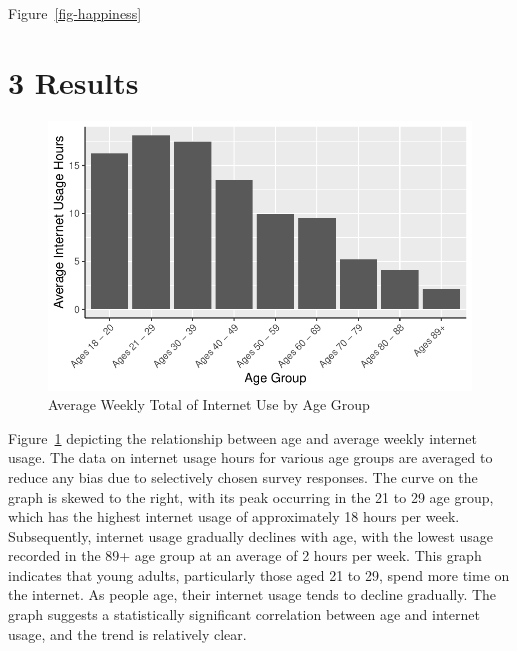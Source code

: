 \documentclass[
  letterpaper,
  DIV=11,
  numbers=noendperiod]{scrartcl}
\begin{document}
Figure~\ref{fig-happiness}

\hypertarget{results}{%
\section{3 Results}\label{results}}

\begin{figure}

{\centering \includegraphics{paper_files/figure-pdf/fig-ageandinternet-1.pdf}

}

\caption{\label{fig-ageandinternet}Average Weekly Total of Internet Use
by Age Group}

\end{figure}

Figure~\ref{fig-ageandinternet} depicting the relationship between age
and average weekly internet usage. The data on internet usage hours for
various age groups are averaged to reduce any bias due to selectively
chosen survey responses. The curve on the graph is skewed to the right,
with its peak occurring in the 21 to 29 age group, which has the highest
internet usage of approximately 18 hours per week. Subsequently,
internet usage gradually declines with age, with the lowest usage
recorded in the 89+ age group at an average of 2 hours per week. This
graph indicates that young adults, particularly those aged 21 to 29,
spend more time on the internet. As people age, their internet usage
tends to decline gradually. The graph suggests a statistically
significant correlation between age and internet usage, and the trend is
relatively clear.
\end{document}
